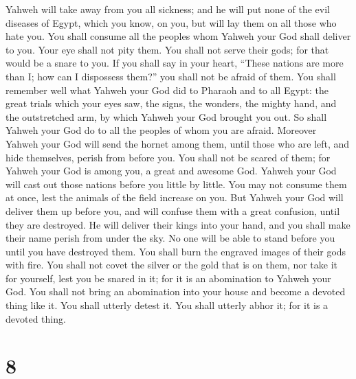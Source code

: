  Yahweh will take away from you all sickness; and he will
put none of the evil diseases of Egypt, which you know, on you, but will
lay them on all those who hate you.  You shall consume all
the peoples whom Yahweh your God shall deliver to you. Your eye shall
not pity them. You shall not serve their gods; for that would be a snare
to you.  If you shall say in your heart, ``These nations
are more than I; how can I dispossess them?''  you shall
not be afraid of them. You shall remember well what Yahweh your God did
to Pharaoh and to all Egypt:  the great trials which your
eyes saw, the signs, the wonders, the mighty hand, and the outstretched
arm, by which Yahweh your God brought you out. So shall Yahweh your God
do to all the peoples of whom you are afraid.  Moreover
Yahweh your God will send the hornet among them, until those who are
left, and hide themselves, perish from before you.  You
shall not be scared of them; for Yahweh your God is among you, a great
and awesome God.  Yahweh your God will cast out those
nations before you little by little. You may not consume them at once,
lest the animals of the field increase on you.  But Yahweh
your God will deliver them up before you, and will confuse them with a
great confusion, until they are destroyed.  He will deliver
their kings into your hand, and you shall make their name perish from
under the sky. No one will be able to stand before you until you have
destroyed them.  You shall burn the engraved images of
their gods with fire. You shall not covet the silver or the gold that is
on them, nor take it for yourself, lest you be snared in it; for it is
an abomination to Yahweh your God.  You shall not bring an
abomination into your house and become a devoted thing like it. You
shall utterly detest it. You shall utterly abhor it; for it is a devoted
thing.

\hypertarget{section-7}{%
\section{8}\label{section-7}}

